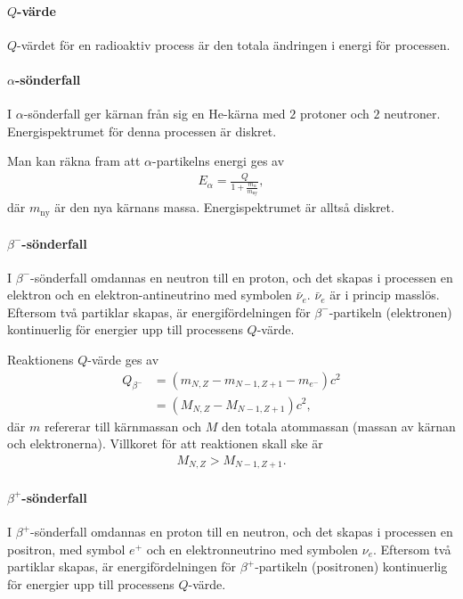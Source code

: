 \paragraph{$Q$-värde}
$Q$-värdet för en radioaktiv process är den totala ändringen i energi för processen.

\paragraph{$\alpha$-sönderfall}
I $\alpha$-sönderfall ger kärnan från sig en He-kärna med $2$ protoner och $2$ neutroner. Energispektrumet för denna processen är diskret.

Man kan räkna fram att $\alpha$-partikelns energi ges av
\begin{align*}
	E_{\alpha} = \frac{Q}{1 + \frac{m_{\alpha}}{m_{\text{ny}}}},
\end{align*}
där $m_{\text{ny}}$ är den nya kärnans massa. Energispektrumet är alltså diskret.

\paragraph{$\beta^{-}$-sönderfall}
I $\beta^{-}$-sönderfall omdannas en neutron till en proton, och det skapas i processen en elektron och en elektron-antineutrino med symbolen $\bar{\nu}_{e}$. $\bar{\nu}_{e}$ är i princip masslös. Eftersom två partiklar skapas, är energifördelningen för $\beta^{-}$-partikeln (elektronen) kontinuerlig för energier upp till processens $Q$-värde.

Reaktionens $Q$-värde ges av
\begin{align*}
	Q_{\beta^{-}} &= (m_{N, Z} - m_{N - 1, Z + 1} - m_{e^{-}})c^{2} \\
	              &= (M_{N, Z} - M_{N - 1, Z + 1})c^{2},
\end{align*}
där $m$ refererar till kärnmassan och $M$ den totala atommassan (massan av kärnan och elektronerna). Villkoret för att reaktionen skall ske är
\begin{align*}
	M_{N, Z} > M_{N - 1, Z + 1}.
\end{align*}

\paragraph{$\beta^{+}$-sönderfall}
I $\beta^{+}$-sönderfall omdannas en proton till en neutron, och det skapas i processen en positron, med symbol $e^{+}$ och en elektronneutrino med symbolen $\nu_{e}$. Eftersom två partiklar skapas, är energifördelningen för $\beta^{+}$-partikeln (positronen) kontinuerlig för energier upp till processens $Q$-värde.

